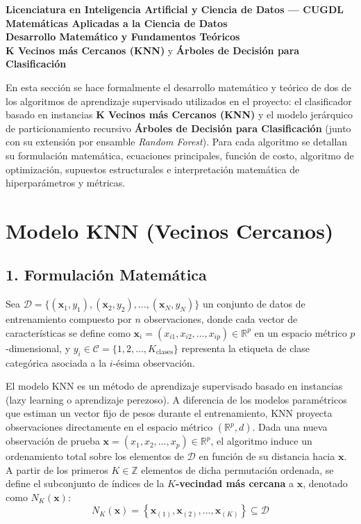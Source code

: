 \documentclass[11pt, a4paper]{article}
\begin{document}
\begin{center}
    {\large\textbf{\textcolor{cugdlindigo}{Licenciatura en Inteligencia Artificial y Ciencia de Datos --- CUGDL}}}\\[0.15cm]
    {\normalsize\textbf{Matemáticas Aplicadas a la Ciencia de Datos}}\\[0.4cm]
    {\LARGE\textbf{\textcolor{cugdlblue}{Desarrollo Matemático y Fundamentos Teóricos}}}\\[0.2cm]
    {\normalsize\textbf{K Vecinos más Cercanos (KNN)} y \textbf{Árboles de Decisión para Clasificación}}
\end{center}
\vspace{0.3cm}

En esta sección se hace formalmente el desarrollo matemático y teórico de dos de los algoritmos de aprendizaje supervisado utilizados en el proyecto: el clasificador basado en instancias \textbf{K Vecinos más Cercanos (KNN)} y el modelo jerárquico de particionamiento recursivo \textbf{Árboles de Decisión para Clasificación} (junto con su extensión por ensamble \textit{Random Forest}). Para cada algoritmo se detallan su formulación matemática, ecuaciones principales, función de costo, algoritmo de optimización, supuestos estructurales e interpretación matemática de hiperparámetros y métricas.

\vspace{0.3cm}
\section*{\textcolor{cugdlblue}{Modelo KNN (Vecinos Cercanos)}}

\subsection*{1. Formulación Matemática}
Sea $\mathcal{D} = \{(\mathbf{x}_1, y_1), (\mathbf{x}_2, y_2), \dots, (\mathbf{x}_N, y_N)\}$ un conjunto de datos de entrenamiento compuesto por $n$ observaciones, donde cada vector de características se define como $\mathbf{x}_i = (x_{i1}, x_{i2}, \dots, x_{ip}) \in \mathbb{R}^p$ en un espacio métrico $p$-dimensional, y $y_i \in \mathcal{C} = \{1, 2, \dots, K_{\text{clases}}\}$ representa la etiqueta de clase categórica asociada a la $i$-ésima observación.

El modelo KNN es un método de aprendizaje supervisado basado en instancias (lazy learning o aprendizaje perezoso). A diferencia de los modelos paramétricos que estiman un vector fijo de pesos durante el entrenamiento, KNN proyecta observaciones directamente en el espacio métrico $(\mathbb{R}^p, d)$. Dada una nueva observación de prueba $\mathbf{x} = (x_1, x_2, \dots, x_p) \in \mathbb{R}^p$, el algoritmo induce un ordenamiento total sobre los elementos de $\mathcal{D}$ en función de su distancia hacia $\mathbf{x}$.
A partir de los primeros $K \in \mathbb{Z}$ elementos de dicha permutación ordenada, se define el subconjunto de índices de la \textbf{$K$-vecindad más cercana} a $\mathbf{x}$, denotado como $N_K(\mathbf{x})$:
\begin{equation}
    N_K(\mathbf{x}) = \left\{ \mathbf{x}_{(1)}, \mathbf{x}_{(2)}, \dots, \mathbf{x}_{(K)} \right\} \subseteq \mathcal{D}
\end{equation}
\end{document}
